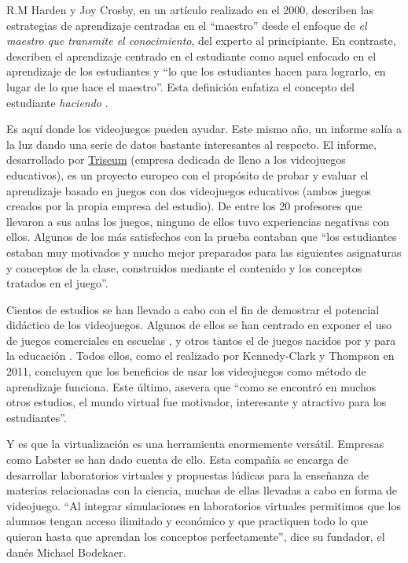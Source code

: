 R.M Harden y Joy Crosby, en un artículo realizado en el 2000, describen las estrategias de aprendizaje centradas en el ``maestro'' desde el enfoque de \textit{el maestro que transmite el conocimiento}, del experto al principiante. En contraste, describen el aprendizaje centrado en el estudiante como aquel enfocado en el aprendizaje de los estudiantes y ``lo que los estudiantes hacen para lograrlo, en lugar de lo que hace el maestro''. Esta definición enfatiza el concepto del estudiante \textit{haciendo} \cite{goodteacher}.

Es aquí donde los videojuegos pueden ayudar. Este mismo año, un informe salía a la luz dando una serie de datos bastante interesantes al respecto. El informe, desarrollado por \href{https://triseum.com/}{Triseum} (empresa dedicada de lleno a los videojuegos educativos), es un proyecto europeo con el propósito de probar y evaluar el aprendizaje basado en juegos con dos videojuegos educativos (ambos juegos creados por la propia empresa del estudio). De entre los 20 profesores que llevaron a sus aulas los juegos, ninguno de ellos tuvo experiencias negativas con ellos. Algunos de los más satisfechos con la prueba contaban que ``los estudiantes estaban muy motivados y mucho mejor preparados para las siguientes asignaturas y conceptos de la clase, construidos mediante el contenido y los conceptos tratados en el juego''\cite{triseum}.

Cientos de estudios se han llevado a cabo con el fin de demostrar el potencial didáctico de los videojuegos. Algunos de ellos se han centrado en exponer el uso de juegos comerciales en escuelas \cite{gamesinclass}, y otros tantos  el de juegos nacidos por y para la educación \cite{edugamesinclass}. Todos ellos, como el realizado por Kennedy-Clark y Thompson en 2011, concluyen que los beneficios de usar los videojuegos como método de aprendizaje funciona. Este último, asevera que ``como se encontró en muchos otros estudios, el mundo virtual fue motivador, interesante y atractivo para los estudiantes''\cite{deathrome}.

Y es que la virtualización es una herramienta enormemente versátil. Empresas como Labster se han dado cuenta de ello. Esta compañía se encarga de desarrollar laboratorios virtuales y propuestas lúdicas para la enseñanza de materias relacionadas con la ciencia, muchas de ellas llevadas a cabo en forma de videojuego\cite{labster}. ``Al integrar simulaciones en laboratorios virtuales permitimos que los alumnos tengan acceso ilimitado y económico y que practiquen todo lo que quieran hasta que aprendan los conceptos perfectamente'', dice su fundador, el danés Michael Bodekaer.	

